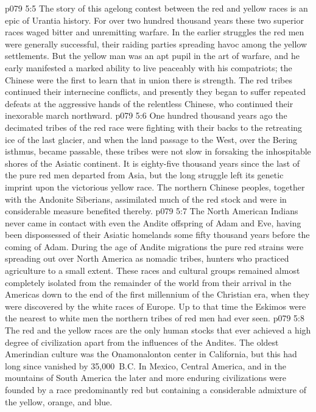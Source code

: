 \vs p079 5:5 The story of this agelong contest between the red and yellow races is an epic of Urantia history. For over two hundred thousand years these two superior races waged bitter and unremitting warfare. In the earlier struggles the red men were generally successful, their raiding parties spreading havoc among the yellow settlements. But the yellow man was an apt pupil in the art of warfare, and he early manifested a marked ability to live peaceably with his compatriots; the Chinese were the first to learn that in union there is strength. The red tribes continued their internecine conflicts, and presently they began to suffer repeated defeats at the aggressive hands of the relentless Chinese, who continued their inexorable march northward.
\pc \vs p079 5:6 One hundred thousand years ago the decimated tribes of the red race were fighting with their backs to the retreating ice of the last glacier, and when the land passage to the West, over the Bering isthmus, became passable, these tribes were not slow in forsaking the inhospitable shores of the Asiatic continent. It is eighty\hyp{}five thousand years since the last of the pure red men departed from Asia, but the long struggle left its genetic imprint upon the victorious yellow race. The northern Chinese peoples, together with the Andonite Siberians, assimilated much of the red stock and were in considerable measure benefited thereby.
\vs p079 5:7 The North American Indians never came in contact with even the Andite offspring of Adam and Eve, having been dispossessed of their Asiatic homelands some fifty thousand years before the coming of Adam. During the age of Andite migrations the pure red strains were spreading out over North America as nomadic tribes, hunters who practiced agriculture to a small extent. These races and cultural groups remained almost completely isolated from the remainder of the world from their arrival in the Americas down to the end of the first millennium of the Christian era, when they were discovered by the white races of Europe. Up to that time the Eskimos were the nearest to white men the northern tribes of red men had ever seen.
\vs p079 5:8 The red and the yellow races are the only human stocks that ever achieved a high degree of civilization apart from the influences of the Andites. The oldest Amerindian culture was the Onamonalonton center in California, but this had long since vanished by 35,000~B.C. In Mexico, Central America, and in the mountains of South America the later and more enduring civilizations were founded by a race predominantly red but containing a considerable admixture of the yellow, orange, and blue.

